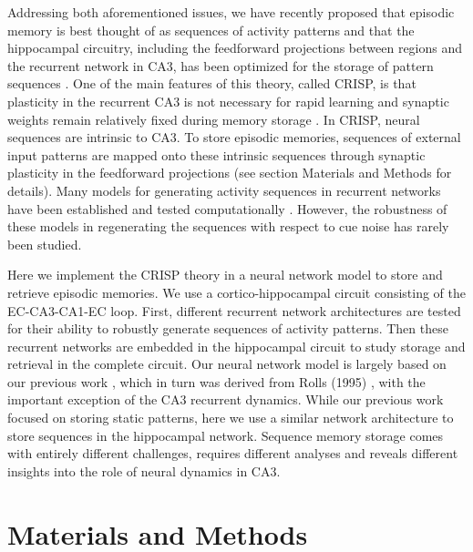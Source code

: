 \documentclass[utf8]{frontiersSCNS} %
\begin{document}
Addressing both aforementioned issues, we have recently proposed that episodic memory is best thought of as sequences of activity patterns \cite{cheng2016episodic} and that the hippocampal circuitry, including the feedforward projections  between regions and the recurrent network in CA3, has been optimized for the storage of pattern sequences \cite{cheng2013crisp}. One of the main features of this theory, called CRISP, is that plasticity in the recurrent CA3 is not necessary for rapid learning and synaptic weights remain relatively fixed during memory storage \cite{nakazawa2003hippocampal, cravens2006ca3}. In CRISP, neural sequences are intrinsic to CA3. To store episodic memories, sequences of external input patterns are mapped onto these intrinsic sequences through synaptic plasticity in the feedforward projections \cite{willshaw1969non} (see section Materials and Methods for details).
Many models for generating activity sequences in recurrent networks have been established and tested computationally \cite{sussillo2009generating, lazar2009sorn, rajan2016recurrent, jaeger2001echo, kropff2007complexity, bayati2015self}. However, the robustness of these models in regenerating the sequences with respect to cue noise has rarely been studied.


Here we implement the CRISP theory in a neural network model to store and retrieve episodic memories. We use a cortico-hippocampal circuit consisting of the EC-CA3-CA1-EC loop. First, different recurrent network architectures are tested for their ability to robustly generate sequences of activity patterns. Then these recurrent networks are embedded in the hippocampal circuit to study storage and retrieval in the complete circuit. Our neural network model is largely based on our previous work  \cite{neher2015memory}, which in turn was derived from Rolls (1995) \cite{fontanari1995model}, with the important exception of the CA3 recurrent dynamics. While our previous work focused on storing static patterns, here we use a similar network architecture to store sequences in the hippocampal network. Sequence memory storage comes with entirely different challenges, requires different analyses and reveals different insights into the role of neural dynamics in CA3. 



\section*{Materials and Methods}
\end{document}
